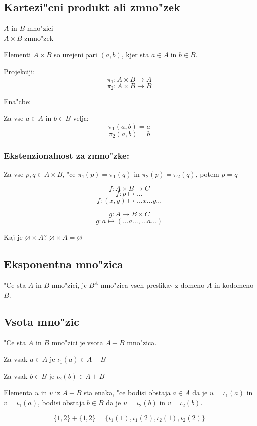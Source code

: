 \subsection{Kartezi"cni produkt ali zmno"zek}
\(A\) in \(B\) mno"zici\\
\(A \times B\) zmno"zek

Elementi \(A \times B\) so urejeni pari \((a, b)\), kjer sta \(a \in A\) in \(b \in B\).

\underline{Projekciji:}
\[\pi_1: A \times B \rightarrow A\]
\[\pi_2: A\times B \rightarrow B \]

\underline{Ena"cbe:}

Za vse \(a \in A\) in \(b \in B\) velja:
\[\pi_1(a, b) = a\]
\[\pi_2(a, b) = b\]

\subsubsection*{Ekstenzionalnost za zmno"zke:} Za vse \(p, q \in A \times B\), "ce \(\pi_1(p) = \pi_1(q)\) in \(\pi_2(p) = \pi_2(q)\),  potem \(p = q\)

\[f: A \times B \rightarrow C\]
\[f: p \mapsto ...\]
\[f: (x, y) \mapsto ... x ... y ...\]

\[g: A \rightarrow B \times C\]
\[g: a \mapsto (...a..., ...a...)\]

Kaj je \(\varnothing \times A\)? \(\varnothing \times A = \varnothing\)


\subsection{Eksponentna mno"zica}
"Ce sta \(A\) in \(B\) mno"zici, je \(B^A\) mno"zica vseh preslikav z domeno \(A\) in kodomeno \(B\).

\subsection{Vsota mno"zic}
"Ce sta \(A\) in \(B\) mno"zici je vsota \(A + B\) mno"zica.

Za vsak \(a \in A\) je \(\iota_1(a) \in A + B\)

Za vsak \(b \in B \) je \(\iota_2(b) \in A + B\)

Elementa \(u\) in \(v\) iz \(A + B\) sta enaka, "ce bodisi obstaja \(a \in A\) da je \(u = \iota_1(a)\) in \(v = \iota_1(a)\), bodisi obstaja \(b \in B\) da je \(u = \iota_2(b)\) in \(v = \iota_2(b)\).

\[\{1, 2\} + \{1, 2\} = \{\iota_1(1), \iota_1(2), \iota_2(1), \iota_2(2)\}\]

